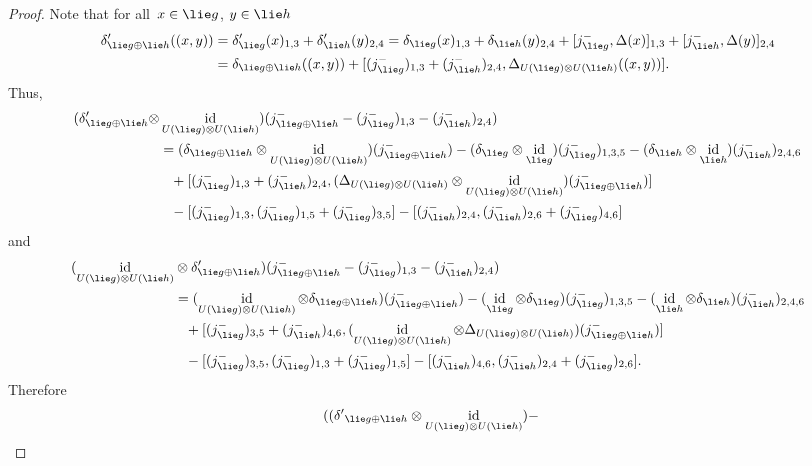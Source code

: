 \documentclass[12pt, reqno]{amsart}
\theoremstyle{definition}
\numberwithin{equation}{section}
\newcommand{\tensor}{\otimes}
\DeclareMathOperator{\id}{id}
\begin{document}
\begin{proof}

Note that for all~$x\in\lie g$, $y\in\lie h$
\begin{align*}
\delta'_{\lie g\oplus\lie h}((x,y))&=\delta'_{\lie g}(x)_{1,3}
+\delta'_{\lie h}(y)_{2,4}=\delta_{\lie g}(x)_{1,3}+\delta_{\lie h}(y)_{2,4}
+
[ j ^-_{\lie g},\Delta(x)]_{1,3}+[ j ^-_{\lie h},\Delta(y)]_{2,4}\\
&=\delta_{\lie g\oplus\lie h}((x,y))+
[( j ^-_{\lie g})_{1,3}+( j ^-_{\lie h})_{2,4},\Delta_{U(\lie g)\tensor U(\lie h)}((x,y))].
\end{align*}
Thus,
\begin{align*}
(\delta'_{\lie g\oplus\lie h}\tensor&\id_{U(\lie g)\tensor U(\lie h)})( j ^-_{\lie g\oplus\lie h}-( j ^-_{\lie g})_{1,3}-( j ^-_{\lie h})_{2,4})
\\
&=(\delta_{\lie g\oplus\lie h}\tensor\id_{U(\lie g)\tensor U(\lie h)})( j ^-_{\lie g\oplus\lie h})-(\delta_{\lie g}\tensor\id_{\lie g})( j ^-_{\lie g})_{1,3,5}
-(\delta_{\lie h}\tensor\id_{\lie h})( j ^-_{\lie h})_{2,4,6}\\
&\phantom{=}
+[( j ^-_{\lie g})_{1,3}+( j ^-_{\lie h})_{2,4},(\Delta_{U(\lie g)\tensor U(\lie h)}\tensor\id_{U(\lie g)\tensor U(\lie h)})( j ^-_{\lie g\oplus\lie h})]\\
&\phantom{=}-[( j ^-_{\lie g})_{1,3},( j ^-_{\lie g})_{1,5}+( j ^-_{\lie g})_{3,5}]-[( j ^-_{\lie h})_{2,4},( j ^-_{\lie h})_{2,6}+( j ^-_{\lie g})_{4,6}]
\end{align*}
and
\begin{align*}
(\id_{U(\lie g)\tensor U(\lie h)}&\tensor\delta'_{\lie g\oplus\lie h})( j ^-_{\lie g\oplus\lie h}-( j ^-_{\lie g})_{1,3}-( j ^-_{\lie h})_{2,4})
\\
&=(\id_{U(\lie g)\tensor U(\lie h)}\tensor\delta_{\lie g\oplus\lie h})( j ^-_{\lie g\oplus\lie h})-(\id_{\lie g}\tensor\delta_{\lie g})( j ^-_{\lie g})_{1,3,5}
-(\id_{\lie h}\tensor\delta_{\lie h})( j ^-_{\lie h})_{2,4,6}\\
&\phantom{=}
+[( j ^-_{\lie g})_{3,5}+( j ^-_{\lie h})_{4,6},(\id_{U(\lie g)\tensor U(\lie h)}\tensor\Delta_{U(\lie g)\tensor U(\lie h)})( j ^-_{\lie g\oplus\lie h})]\\
&\phantom{=}-[( j ^-_{\lie g})_{3,5},( j ^-_{\lie g})_{1,3}+( j ^-_{\lie g})_{1,5}]-[( j ^-_{\lie h})_{4,6},( j ^-_{\lie h})_{2,4}+( j ^-_{\lie g})_{2,6}].
\end{align*}
Therefore
\begin{align*}
((\delta'&_{\lie g\oplus\lie h}\tensor\id_{U(\lie g)\tensor U(\lie h)})-

\end{align*}
\end{proof}
\end{document}
